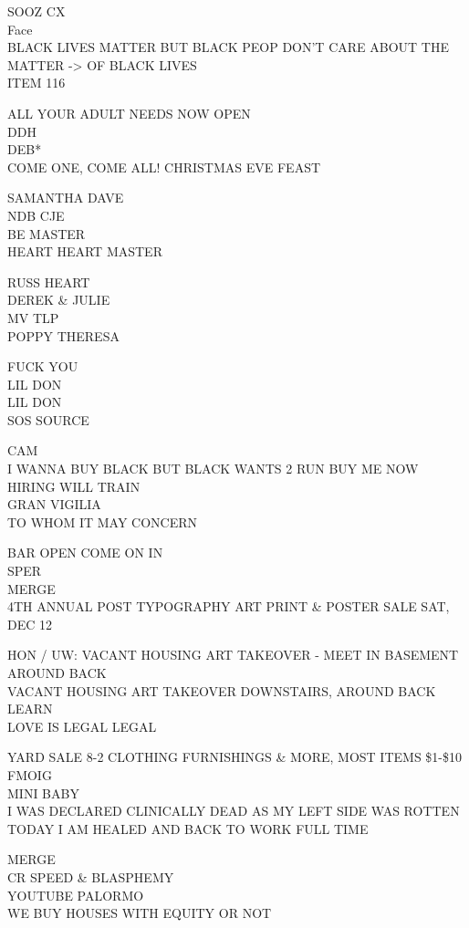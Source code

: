 \documentclass[10pt,letterpaper]{article}
\begin{document}
SOOZ CX\\
Face\\
BLACK LIVES MATTER BUT BLACK PEOP DON'T CARE ABOUT THE MATTER {-}> OF BLACK LIVES\\
ITEM 116

ALL YOUR ADULT NEEDS NOW OPEN\\
DDH\\
DEB*\\
COME ONE, COME ALL!  CHRISTMAS EVE FEAST

SAMANTHA DAVE\\
NDB CJE\\
BE MASTER\\
HEART HEART MASTER

RUSS HEART\\
DEREK \& JULIE\\
MV TLP\\
POPPY THERESA

FUCK YOU\\
LIL DON\\
LIL DON\\
SOS SOURCE

CAM\\
I WANNA BUY BLACK BUT BLACK WANTS 2 RUN BUY ME NOW HIRING WILL TRAIN\\
GRAN VIGILIA\\
TO WHOM IT MAY CONCERN

BAR OPEN COME ON IN\\
SPER\\
MERGE\\
4TH ANNUAL POST TYPOGRAPHY ART PRINT \& POSTER SALE SAT, DEC 12

HON / UW: VACANT HOUSING ART TAKEOVER {-} MEET IN BASEMENT AROUND BACK\\
VACANT HOUSING ART TAKEOVER DOWNSTAIRS, AROUND BACK\\
LEARN\\
LOVE IS LEGAL LEGAL

YARD SALE 8{-}2 CLOTHING FURNISHINGS \& MORE, MOST ITEMS \$1{-}\$10\\
FMOIG\\
MINI BABY\\
I WAS DECLARED CLINICALLY DEAD AS MY LEFT SIDE WAS ROTTEN TODAY I AM HEALED AND BACK TO WORK FULL TIME

MERGE\\
CR SPEED \& BLASPHEMY\\
YOUTUBE PALORMO\\
WE BUY HOUSES WITH EQUITY OR NOT
\end{document}
